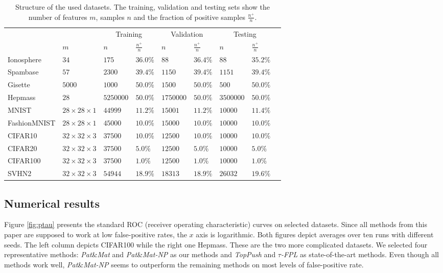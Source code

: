 \documentclass[]{interact}
\theoremstyle{plain}%
\theoremstyle{definition}
\theoremstyle{remark}
\newcommand{\toppush}{\emph{TopPush}\xspace}
\newcommand{\patmat}{\emph{Pat}\&\emph{Mat}\xspace}
\newcommand{\npB}{{\emph{Pat}\&\emph{Mat-NP}}\xspace}
\newcommand{\npC}{{\emph{$\tau$-FPL}}\xspace}
\newcommand{\NEW}[1]{{\color{blue} #1}}
\begin{document}
\begin{table}[!ht]
\caption{Structure of the used datasets. The training, validation and testing sets show the number of features $m$, samples $n$ and the fraction of positive samples $\frac{n^+}{n}$.}
\label{tab:counts}
\centering
\begin{tabular}{@{}lllllllll@{}}
\toprule
 &  & \multicolumn{2}{c}{Training} & \multicolumn{2}{c}{Validation} & \multicolumn{2}{c}{Testing} \\ \cmidrule(lr){3-4} \cmidrule(lr){5-6} \cmidrule(l){7-8} 
 & $m$ & $n$ & $\frac{n^+}{n}$ & $n$ & $\frac{n^+}{n}$ & $n$ & $\frac{n^+}{n}$ \\ \midrule
Ionosphere & $34$ & $175$ & $36.0\%$ & $88$ & $36.4\%$ & $88$ & $35.2\%$ \\
Spambase & $57$ & $2300$ & $39.4\%$ & $1150$ & $39.4\%$ & $1151$ & $39.4\%$ \\
Gisette & $5000$ & $1000$ & $50.0\%$ & $1500$ & $50.0\%$ & $500$ & $50.0\%$ \\
Hepmass & $28$ & $5250000$ & $50.0\%$ & $1750000$ & $50.0\%$ & $3500000$ & $50.0\%$ \\
MNIST & $28\times 28 \times 1$ & $44999$ & $11.2\%$ & $15001$ & $11.2\%$ & $10000$ & $11.4\%$ \\
FashionMNIST & $28\times 28\times 1$ & $45000$ & $10.0\%$ & $15000$ & $10.0\%$ & $10000$ & $10.0\%$ \\
CIFAR10 & $32\times 32\times 3$ & $37500$ & $10.0\%$ & $12500$ & $10.0\%$ & $10000$ & $10.0\%$ \\
CIFAR20 & $32\times 32\times 3$ & $37500$ & $5.0\%$ & $12500$ & $5.0\%$ & $10000$ & $5.0\%$ \\
CIFAR100 & $32\times 32\times 3$ & $37500$ & $1.0\%$ & $12500$ & $1.0\%$ & $10000$ & $1.0\%$ \\
SVHN2 & $32\times 32\times 3$ & $54944$ & $18.9\%$ & $18313$ & $18.9\%$ & $26032$ & $19.6\%$ \\
\bottomrule
\end{tabular}
\end{table}


\subsection{Numerical results}


Figure \ref{fig:ptau} presents the standard ROC (receiver operating characteristic) curves on selected datasets. Since all methods from this paper are supposed to work at low false-positive rates, the $x$ axis is logarithmic. \NEW{Both figures depict averages over ten runs with different seeds. The left column depicts CIFAR100 while the right one Hepmass.} These are the two more complicated datasets. We selected four representative methods: \patmat and \npB as our methods and \toppush and \npC as state-of-the-art methods. \NEW{Even though all methods work well, \npB seems to outperform the remaining methods on most levels of false-positive rate.}
\end{document}
